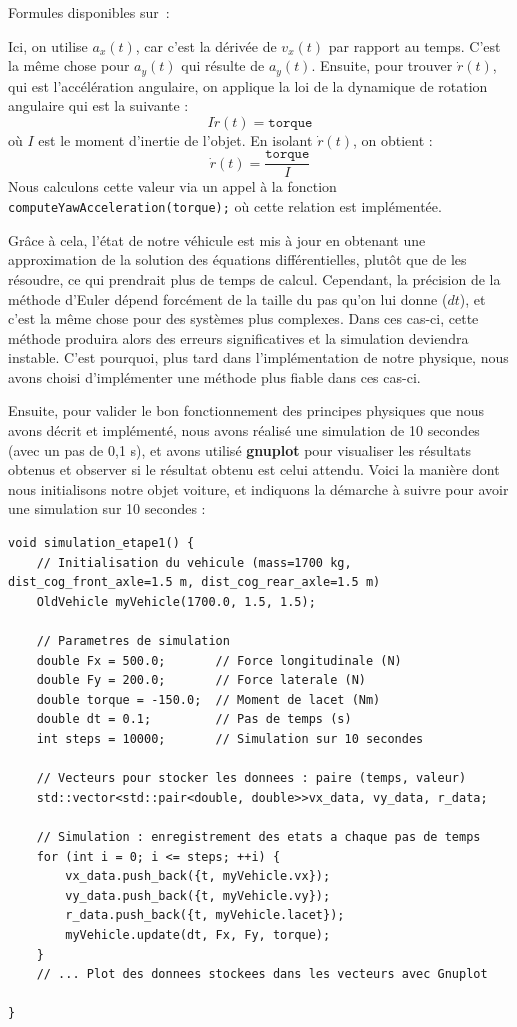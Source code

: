 \begin{center}
    Formules disponibles sur~\cite{euler_explicite}:
\end{center}

Ici, on utilise $a_x(t)$, car c'est la dérivée de $v_x(t)$ par rapport au temps.
C'est la même chose pour $a_y(t)$ qui résulte de $a_y(t)$.
Ensuite, pour trouver $\dot{r}(t)$, qui est l'accélération angulaire, on applique la loi de la dynamique de rotation angulaire qui est la suivante :
$$I\dot{r}(t) = \texttt{torque}$$
où $I$ est le moment d'inertie de l'objet.
En isolant $\dot{r}(t)$, on obtient :
$$\dot{r}(t)= \frac{\texttt{torque}}{I}$$
Nous calculons cette valeur via un appel à la fonction \texttt{computeYawAcceleration(torque);} où cette relation est implémentée.

Grâce à cela, l'état de notre véhicule est mis à jour en obtenant une approximation de la solution des équations différentielles, plutôt que de les résoudre, ce qui prendrait plus de temps de calcul.
Cependant, la précision de la méthode d'Euler dépend forcément de la taille du pas qu'on lui donne ($dt$), et c'est la même chose pour des systèmes plus complexes. Dans ces cas-ci, cette méthode produira alors des erreurs significatives et la simulation deviendra instable. C'est pourquoi, plus tard dans l'implémentation de notre physique, nous avons choisi d'implémenter une méthode plus fiable dans ces cas-ci.

Ensuite, pour valider le bon fonctionnement des principes physiques que nous avons décrit et implémenté, nous avons réalisé une simulation de 10 secondes (avec un pas de 0,1 s), et avons utilisé \textbf{\gls{gnuplot}} pour visualiser les résultats obtenus et observer si le résultat obtenu est celui attendu. Voici la manière dont nous initialisons notre objet voiture, et indiquons la démarche à suivre pour avoir une simulation sur 10 secondes :

\begin{lstlisting}[style=CStyle,label={lst:void_simulation_etape1}]
void simulation_etape1() {
    // Initialisation du vehicule (mass=1700 kg, dist_cog_front_axle=1.5 m, dist_cog_rear_axle=1.5 m)
    OldVehicle myVehicle(1700.0, 1.5, 1.5);

    // Parametres de simulation
    double Fx = 500.0;       // Force longitudinale (N)
    double Fy = 200.0;       // Force laterale (N)
    double torque = -150.0;  // Moment de lacet (Nm)
    double dt = 0.1;         // Pas de temps (s)
    int steps = 10000;       // Simulation sur 10 secondes

    // Vecteurs pour stocker les donnees : paire (temps, valeur)
    std::vector<std::pair<double, double>>vx_data, vy_data, r_data;

    // Simulation : enregistrement des etats a chaque pas de temps
    for (int i = 0; i <= steps; ++i) {
        vx_data.push_back({t, myVehicle.vx});
        vy_data.push_back({t, myVehicle.vy});
        r_data.push_back({t, myVehicle.lacet});
        myVehicle.update(dt, Fx, Fy, torque);
    }
    // ... Plot des donnees stockees dans les vecteurs avec Gnuplot

}
\end{lstlisting}

